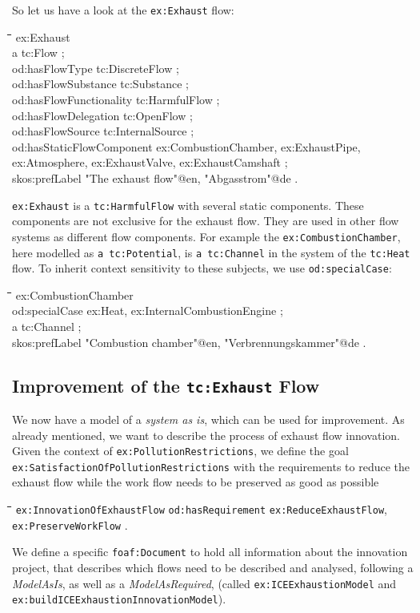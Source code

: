 \documentclass[a4paper,11pt]{article}
\newenvironment{code}{\tt \begin{tabbing}
\hskip12pt\=\hskip12pt\=\hskip12pt\=\hskip12pt\=\hskip5cm\=\hskip5cm\=\kill}
{\end{tabbing}}
\begin{document}
So let us have a look at the \texttt{ex:Exhaust} flow:
\begin{code}
ex:Exhaust \\
\> a tc:Flow ; \\
\> od:hasFlowType tc:DiscreteFlow ; \\
\> od:hasFlowSubstance tc:Substance ; \\
\> od:hasFlowFunctionality tc:HarmfulFlow ; \\
\> od:hasFlowDelegation tc:OpenFlow ; \\
\> od:hasFlowSource tc:InternalSource ; \\
\> od:hasStaticFlowComponent ex:CombustionChamber, ex:ExhaustPipe, \\
\>\> ex:Atmosphere, ex:ExhaustValve, ex:ExhaustCamshaft ; \\
\> skos:prefLabel "The exhaust flow"@en, "Abgasstrom"@de . \\
\end{code}

\texttt{ex:Exhaust} is a \texttt{tc:HarmfulFlow} with several static
components. These components are not exclusive for the exhaust flow.  They are
used in other flow systems as different flow components. For example the
\texttt{ex:CombustionChamber}, here modelled as \texttt{a tc:Potential}, is
\texttt{a tc:Channel} in the system of the \texttt{tc:Heat} flow. To inherit
context sensitivity to these subjects, we use \texttt{od:specialCase}:
\cite{RDFC}

\begin{code}
ex:CombustionChamber \\
\> od:specialCase ex:Heat, ex:InternalCombustionEngine ; \\
\> a tc:Channel ; \\
\> skos:prefLabel "Combustion chamber"@en, "Verbrennungskammer"@de .
\end{code}

\subsection{Improvement of the \texttt{tc:Exhaust} Flow}

We now have a model of a \emph{system as is}, which can be used for
improvement.  As already mentioned, we want to describe the process of exhaust
flow innovation. Given the context of \texttt{ex:PollutionRestrictions}, we
define the goal \texttt{ex:SatisfactionOfPollutionRestric\-tions} with the
requirements to reduce the exhaust flow while the work flow needs to be
preserved as good as possible 
\begin{code}
\> \texttt{ex:InnovationOfExhaustFlow} \texttt{od:hasRequirement}
  \texttt{ex:ReduceExhaustFlow},\\\>\> \texttt{ex:PreserveWorkFlow} .
\end{code}
We define a specific \texttt{foaf:Document} to hold all information about the
innovation project, that describes which flows need to be described and
analysed, following a \emph{ModelAsIs}, as well as a \emph{ModelAsRequired},
(called \texttt{ex:ICEExhaustionModel} and
\texttt{ex:buildICEExhaustionInnova\-tion\-Model}).
\end{document}
